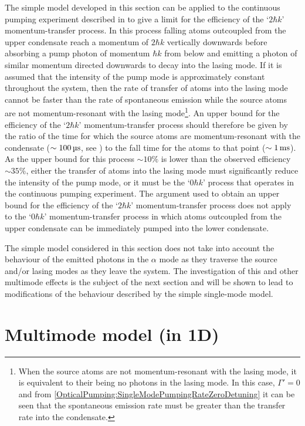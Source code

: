 The simple model developed in this section can be applied to the continuous pumping experiment described in  to give a limit for the efficiency of the `$2 \hbar k$' momentum-transfer process.  In this process falling atoms outcoupled from the upper condensate reach a momentum of $2\hbar k$ vertically downwards before absorbing a pump photon of momentum $\hbar k$ from below and emitting a photon of similar momentum directed downwards to decay into the lasing mode.  If it is assumed that the intensity of the pump mode is approximately constant throughout the system, then the rate of transfer of atoms into the lasing mode cannot be faster than the rate of spontaneous emission while the source atoms are not momentum-resonant with the lasing mode\footnote{When the source atoms are not momentum-resonant with the lasing mode, it is equivalent to their being no photons in the lasing mode.  In this case, $\Gamma'=0$ and from \eqref{OpticalPumping:SingleModePumpingRateZeroDetuning} it can be seen that the spontaneous emission rate must be greater than the transfer rate into the condensate.}.  An upper bound for the efficiency of the `$2 \hbar k$' momentum-transfer process should therefore be given by the ratio of the time for which the source atoms are momentum-resonant with the condensate ($\sim\unit[100]{\micro s}$, see ) to the fall time for the atoms to that point ($\sim\unit[1]{ms}$).  As the upper bound for this process $\sim 10\%$ is lower than the observed efficiency $\sim 35\%$, either the transfer of atoms into the lasing mode must significantly reduce the intensity of the pump mode, or it must be the `$0 \hbar k$' process that operates in the continuous pumping experiment.  The argument used to obtain an upper bound for the efficiency of the `$2 \hbar k$' momentum-transfer process does not apply to the `$0 \hbar k$' momentum-transfer process in which atoms outcoupled from the upper condensate can be immediately pumped into the lower condensate.

The simple model considered in this section does not take into account the behaviour of the emitted photons in the $\alpha$ mode as they traverse the source and/or lasing modes as they leave the system.  The investigation of this and other multimode effects is the subject of the next section and will be shown to lead to modifications of the behaviour described by the simple single-mode model.

\section{Multimode model (in 1D)}
\label{OpticalPumping:MultimodeModel}

